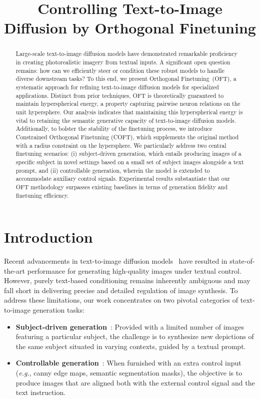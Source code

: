 \title{Controlling Text-to-Image Diffusion by Orthogonal Finetuning}

\begin{abstract}
Large-scale text-to-image diffusion models have demonstrated remarkable proficiency in creating photorealistic imagery from textual inputs. A significant open question remains: how can we efficiently steer or condition these robust models to handle diverse downstream tasks? To this end, we present Orthogonal Finetuning~(OFT), a systematic approach for refining text-to-image diffusion models for specialized applications. Distinct from prior techniques, OFT is theoretically guaranteed to maintain hyperspherical energy, a property capturing pairwise neuron relations on the unit hypersphere. Our analysis indicates that maintaining this hyperspherical energy is vital to retaining the semantic generative capacity of text-to-image diffusion models. Additionally, to bolster the stability of the finetuning process, we introduce Constrained Orthogonal Finetuning (COFT), which supplements the original method with a radius constraint on the hypersphere. We particularly address two central finetuning scenarios: (i) subject-driven generation, which entails producing images of a specific subject in novel settings based on a small set of subject images alongside a text prompt, and (ii) controllable generation, wherein the model is extended to accommodate auxiliary control signals. Experimental results substantiate that our OFT methodology surpasses existing baselines in terms of generation fidelity and finetuning efficiency.
\end{abstract}

\section{Introduction}

Recent advancements in text-to-image diffusion models~\cite{saharia2022photorealistic,ramesh2022hierarchical,rombach2022high} have resulted in state-of-the-art performance for generating high-quality images under textual control. However, purely text-based conditioning remains inherently ambiguous and may fall short in delivering precise and detailed regulation of image synthesis. To address these limitations, our work concentrates on two pivotal categories of text-to-image generation tasks:

\begin{itemize}[leftmargin=*,nosep]

    \item \textbf{Subject-driven generation}~\cite{ruiz2023dreambooth}: Provided with a limited number of images featuring a particular subject, the challenge is to synthesize new depictions of the same subject situated in varying contexts, guided by a textual prompt.
    \item \textbf{Controllable generation}~\cite{zhang2023adding,mou2023t2i}: When furnished with an extra control input (\emph{e.g.}, canny edge maps, semantic segmentation masks), the objective is to produce images that are aligned both with the external control signal and the text instruction.
\end{itemize}

